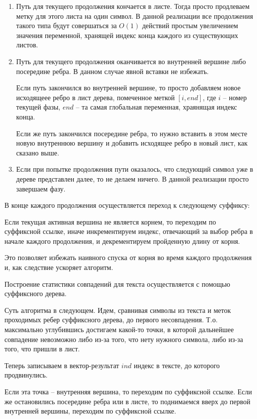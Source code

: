 \documentclass[12pt]{article}
\begin{document}
\begin{enumerate}
    \item Путь для текущего продолжения кончается в листе. Тогда просто продлеваем метку для этого листа на один символ. В данной реализации все продолжения такого типа будут совершаться за $O(1)$ действий простым увеличением значения переменной, хранящей индекс конца каждого из существующих листов.
    \item Путь для текущего продолжения оканчивается во внутренней вершине либо посередине ребра. В данном случае явной вставки не избежать. 
    
    Если путь закончился во внутренней вершине, то просто добавляем новое исходящеее ребро в лист дерева, помеченное меткой $[i, end]$, где $i$ -- номер текущей фазы, $end$ -- та самая глобальная переменная, храянящая индекс конца.
    
    Если же путь закончился посередине ребра, то нужно вставить в этом месте новую внутреннюю вершину и добавить исходящее ребро в новый лист, как сказано выше.
    \item
    Если при попытке продолжения пути оказалось, что следующий символ уже в дереве представлен далее, то не делаем ничего. В данной реализации просто завершаем фазу.
\end{enumerate}

В конце каждого продолжения осуществляется переход к следующему суффиксу:

Если текущая активная вершина не является корнем, то переходим по суффиксной ссылке, иначе инкрементируем индекс, отвечающий за выбор ребра в начале каждого продолжения, и декрементируем пройденную длину от корня.

Это позволяет избежать наивного спуска от корня во время каждого продолжения и, как следствие ускоряет алгоритм.

Построение статистики совпадений для текста осуществляется с помощью суффиксного дерева.

Суть алгоритма в следующем. 
Идем, сравнивая символы из текста и меток проходимых ребер суффиксного дерева, до первого несовпадения. Т.о. максимально углубившись достигаем какой-то точки, в которой дальнейшее совпадение невозможно либо из-за того, что нету нужного символа, либо из-за того, что пришли в лист. 

Теперь записываем в вектор-результат $ind$ индекс в тексте, до которого продвинулись.

Если эта точка -- внутренняя вершина, то переходим по суффиксной ссылке. Если же остановились посередине ребра или в листе, то поднимаемся вверх до первой внутренней вершины, переходим по суффиксной ссылке.
\end{document}
